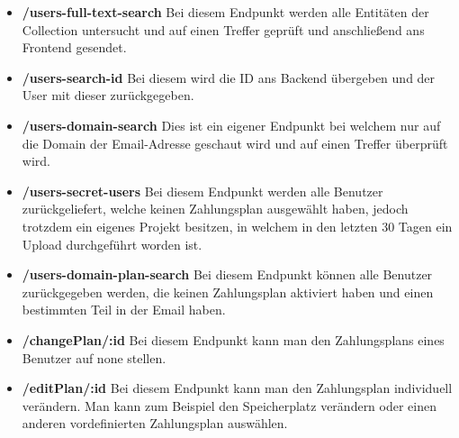 \begin{itemize}
    \item \textbf{/users-full-text-search}
        \newline
        Bei diesem Endpunkt werden alle Entitäten der Collection untersucht und auf einen Treffer geprüft und anschließend ans Frontend gesendet.
    \item \textbf{/users-search-id}
        \newline
        Bei diesem wird die ID ans Backend übergeben und der User mit dieser zurückgegeben.
    \item \textbf{/users-domain-search}
        \newline
        Dies ist ein eigener Endpunkt bei welchem nur auf die Domain der Email-Adresse geschaut wird und auf einen Treffer überprüft wird.
    \item \textbf{/users-secret-users}
        \newline
        Bei diesem Endpunkt werden alle Benutzer zurückgeliefert, welche keinen Zahlungsplan ausgewählt haben, jedoch trotzdem ein eigenes Projekt besitzen, in welchem in den letzten 30 Tagen ein Upload durchgeführt worden ist.
    \item \textbf{/users-domain-plan-search}
        \newline
        Bei diesem Endpunkt können alle Benutzer zurückgegeben werden, die keinen Zahlungsplan aktiviert haben und einen bestimmten Teil in der Email haben.
    \item \textbf{/changePlan/:id}
        \newline
        Bei diesem Endpunkt kann man den Zahlungsplans eines Benutzer auf none stellen.
    \item \textbf{/editPlan/:id}
        \newline
        Bei diesem Endpunkt kann man den Zahlungsplan individuell verändern. Man kann zum Beispiel den Speicherplatz verändern oder einen anderen vordefinierten Zahlungsplan auswählen.
\end{itemize}